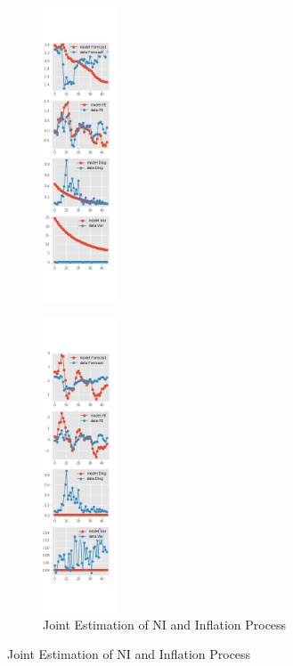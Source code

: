 \documentclass[]{article}
\begin{document}
\begin{figure}[ht]
\begin{subfigure}[b]{\textwidth}
		\includegraphics[width=0.24\textwidth]{figures/spf_ni_est_diag3.png}
	\end{subfigure}
	\vspace{1em}
	\vfill
	\begin{subfigure}[b]{\textwidth}
		\centering
		\caption{Joint Estimation of NI and Inflation Process}
		\label{NI_diag_joint_SPF}
		\includegraphics[width=0.24\textwidth]{figures/spf_ni_est_joint_diag0.png}

\end{subfigure}
\end{figure}
\end{document}
